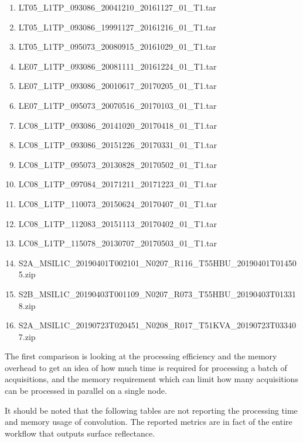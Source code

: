 \documentclass[a4paper]{article}
\begin{document}
      \begin{enumerate}
        \item \footnotesize{LT05\_L1TP\_093086\_20041210\_20161127\_01\_T1.tar}
        \item \footnotesize{LT05\_L1TP\_093086\_19991127\_20161216\_01\_T1.tar}
        \item \footnotesize{LT05\_L1TP\_095073\_20080915\_20161029\_01\_T1.tar}
        \item \footnotesize{LE07\_L1TP\_093086\_20081111\_20161224\_01\_T1.tar}
        \item \footnotesize{LE07\_L1TP\_093086\_20010617\_20170205\_01\_T1.tar}
        \item \footnotesize{LE07\_L1TP\_095073\_20070516\_20170103\_01\_T1.tar}
        \item \footnotesize{LC08\_L1TP\_093086\_20141020\_20170418\_01\_T1.tar}
        \item \footnotesize{LC08\_L1TP\_093086\_20151226\_20170331\_01\_T1.tar}
        \item \footnotesize{LC08\_L1TP\_095073\_20130828\_20170502\_01\_T1.tar}
        \item \footnotesize{LC08\_L1TP\_097084\_20171211\_20171223\_01\_T1.tar}
        \item \footnotesize{LC08\_L1TP\_110073\_20150624\_20170407\_01\_T1.tar}
        \item \footnotesize{LC08\_L1TP\_112083\_20151113\_20170402\_01\_T1.tar}
        \item \footnotesize{LC08\_L1TP\_115078\_20130707\_20170503\_01\_T1.tar}
        \item \footnotesize{S2A\_MSIL1C\_20190401T002101\_N0207\_R116\_T55HBU\_20190401T014505.zip}
        \item \footnotesize{S2B\_MSIL1C\_20190403T001109\_N0207\_R073\_T55HBU\_20190403T013318.zip}
        \item \footnotesize{S2A\_MSIL1C\_20190723T020451\_N0208\_R017\_T51KVA\_20190723T033407.zip}
      \end{enumerate}

    \begin{flushleft}
      The first comparison is looking at the processing efficiency and the memory overhead to get an idea of how much time is required for processing a batch of acquisitions, and the memory requirement which can limit how many acquisitions can be processed in parallel on a single node. \par
      It should be noted that the following tables are not reporting the processing time and memory usage of convolution. The reported metrics are in fact of the entire workflow that outputs surface reflectance.
    \end{flushleft}
\end{document}
